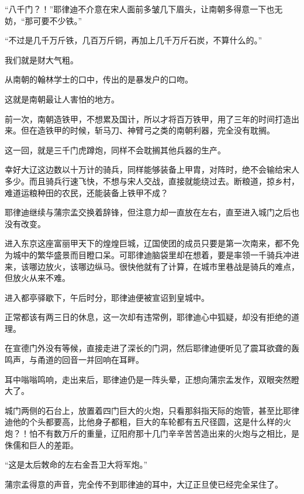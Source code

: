 “八千门？！”耶律迪不介意在宋人面前多皱几下眉头，让南朝多得意一下也无妨，“那可要不少铁。”

“不过是几千万斤铁，几百万斤铜，再加上几千万斤石炭，不算什么的。”

我们就是财大气粗。

从南朝的翰林学士的口中，传出的是暴发户的口吻。

这就是南朝最让人害怕的地方。

前一次，南朝造铁甲，不想累及国计，所以才将百万铁甲，用了三年的时间打造出来。但在造铁甲的时候，斩马刀、神臂弓之类的南朝利器，完全没有耽搁。

这一回，就是三千门虎蹲炮，同样不会耽搁其他兵器的生产。

幸好大辽这边数以十万计的骑兵，同样能够装备上甲胄，对阵时，绝不会输给宋人多少。而且骑兵行速飞快，不想与宋人交战，直接就能绕过去。断粮道，掠乡村，难道运粮种田的农民，还能装备上铁甲不成？

耶律迪继续与蒲宗孟交换着辞锋，但注意力却一直放在左右，直至进入城门之后也没有改变。

进入东京这座富丽甲天下的煌煌巨城，辽国使团的成员只要是第一次南来，都不免为城中的繁华盛景而目瞪口呆。可耶律迪脑袋里却在想着，要是率领一千骑兵冲进来，该哪边放火，该哪边纵马。很快他就有了计算，在城市里巷战是骑兵的难点，但放火从来不难。

进入都亭驿歇下，午后时分，耶律迪便被宣诏到皇城中。

正常都该有两三日的休息，这一次却有违常例，耶律迪心中狐疑，却没有拒绝的道理。

在宣德门外没有等候，直接走进了深长的门洞，然后耶律迪便听见了震耳欲聋的轰鸣声，与甬道的回音一并回响在耳畔。

耳中嗡嗡鸣响，走出来后，耶律迪仍是一阵头晕，正想向蒲宗孟发作，双眼突然瞪大了。

城门两侧的石台上，放置着四门巨大的火炮，只看那斜指天际的炮管，甚至比耶律迪他的个头都要高，比他身子都粗，巨大的车轮都有五尺径圆，这是什么样的火炮？！怕不有数万斤的重量，辽阳府那十几门辛辛苦苦造出来的火炮与之相比，是侏儒和巨人的差距。

“这是太后敇命的左右金吾卫大将军炮。”

蒲宗孟得意的声音，完全传不到耶律迪的耳中，大辽正旦使已经完全呆住了。
